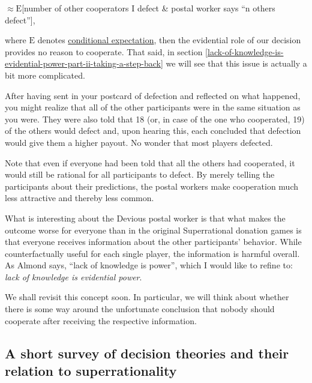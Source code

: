$\approx \mathrm{E}${[}number of other cooperators \textbar{} I defect \& postal worker
says ``n others defect''{]},

where $\mathrm{E}$ denotes
\href{https://en.wikipedia.org/wiki/Conditional_expectation}{conditional
expectation}, then the evidential role of our decision provides no
reason to cooperate. That said, in section
\ref{lack-of-knowledge-is-evidential-power-part-ii-taking-a-step-back} we
will see that this issue is actually a bit more complicated.

After having sent in your postcard of defection and reflected on what
happened, you might realize that all of the other participants were in
the same situation as you were. They were also told that 18 (or, in case
of the one who cooperated, 19) of the others would defect and, upon
hearing this, each concluded that defection would give them a higher
payout. No wonder that most players defected.

Note that even if everyone had been told that all the others had
cooperated, it would still be rational for all participants to defect.
By merely telling the participants about their predictions, the postal
workers make cooperation much less attractive and thereby less common.

What is interesting about the Devious postal worker is that what makes
the outcome worse for everyone than in the original Superrational
donation games is that everyone receives information about the other
participants' behavior. While counterfactually useful for each single
player, the information is harmful overall. As Almond 
\citeyear{Almond2010-xn} says, ``lack of knowledge is
power'', which I would like to refine to: \emph{lack of knowledge is
evidential power}.

We shall revisit this concept soon. In particular, we will think about
whether there is some way around the unfortunate conclusion that nobody
should cooperate after receiving the respective information.

\hypertarget{a-short-survey-of-decision-theories-and-their-relation-to-superrationality}{\subsection{A
short survey of decision theories and their relation to
superrationality}\label{a-short-survey-of-decision-theories-and-their-relation-to-superrationality}}

